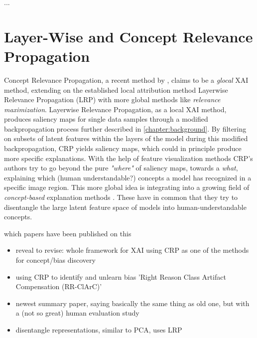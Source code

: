...



\section{Layer-Wise and Concept Relevance Propagation}


Concept Relevance Propagation, a recent method by \cite{Achtibat2022}, claims to be a \textit{glocal} XAI method, extending on the established local attribution method Layerwise Relevance Propagation (LRP) \cite{Bach2015} with more global methods like \textit{relevance maximization}. 
Layerwise Relevance Propagation, as a local XAI method, produces saliency maps for single data samples through a modified backpropagation process further described in \autoref{chapter:background}. By filtering on subsets of latent features within the layers of the model during this modified backpropagation, CRP yields saliency maps, which could in principle produce more specific explanations. With the help of feature visualization methods CRP's authors try to go beyond the pure \textit{"where"} of saliency maps, towards a \textit{what}, explaining which (human understandable?) concepts a model has recognized in a specific image region. This more global idea is integrating into a growing field of \textit{concept-based} explanation methods .
These have in common that they try to disentangle the large latent feature space of models into human-understandable concepts.


which papers have been published on this
\begin{itemize}
      \item reveal to revise: whole framework for XAI using CRP as one of the methods for concept/bias discovery \cite{Pahde2023}
      \item using CRP to identify and unlearn bias 'Right Reason Class Artifact Compensation (RR-ClArC)' \cite{Dreyer2023a}
      \item newest summary paper, saying basically the same thing as old one, but with a (not so great) human evaluation study \cite{Achtibat2023}
      \item disentangle representations, similar to PCA, uses LRP \cite{Chormai2022}
\end{itemize}

